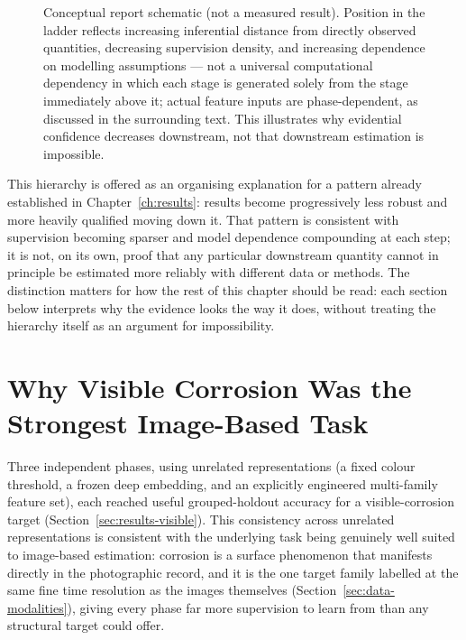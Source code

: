 \begin{figure}[htbp]
\centering
\resizebox{0.85\textwidth}{!}{}
\caption{Conceptual report schematic (not a measured result). Position in
the ladder reflects increasing inferential distance from directly observed
quantities, decreasing supervision density, and increasing dependence on
modelling assumptions — not a universal computational dependency in which
each stage is generated solely from the stage immediately above it; actual
feature inputs are phase-dependent, as discussed in the surrounding text.
This illustrates why evidential confidence decreases downstream, not that
downstream estimation is impossible.}
\label{fig:evidence-hierarchy}
\end{figure}

This hierarchy is offered as an organising explanation for a pattern
already established in Chapter~\ref{ch:results}: results become
progressively less robust and more heavily qualified moving down it.
That pattern is consistent with supervision becoming sparser and model
dependence compounding at each step; it is not, on its own, proof that any
particular downstream quantity cannot in principle be estimated more
reliably with different data or methods. The distinction matters for how
the rest of this chapter should be read: each section below interprets why
the evidence looks the way it does, without treating the hierarchy itself
as an argument for impossibility.

\section{Why Visible Corrosion Was the Strongest Image-Based Task}
\label{sec:interp-visible}

Three independent phases, using unrelated representations (a fixed colour
threshold, a frozen deep embedding, and an explicitly engineered
multi-family feature set), each reached useful grouped-holdout accuracy
for a visible-corrosion target (Section~\ref{sec:results-visible}). This
consistency across unrelated representations is consistent with the
underlying task being genuinely well suited to image-based estimation:
corrosion is a surface phenomenon that manifests directly in the
photographic record, and it is the one target family labelled at the same
fine time resolution as the images themselves
(Section~\ref{sec:data-modalities}), giving every phase far more
supervision to learn from than any structural target could offer.

